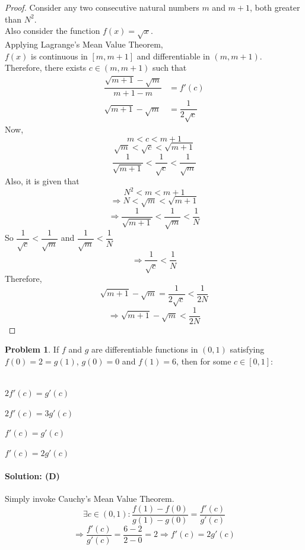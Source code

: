 \documentclass[14]{article}
\theoremstyle{definition}
\newtheorem{prob}{Problem}
\begin{document}
\begin{proof}
Consider any two consecutive natural numbers $m$ and $m + 1$, both greater than $N^2$.\\
Also consider the function $f(x) = \sqrt{x}$.\\
Applying Lagrange's Mean Value Theorem,\\
$f(x)$ is continuous in $[m, m + 1]$ and differentiable in $(m, m + 1)$.\\
Therefore, there exists $c \in (m, m+1)$ such that
\begin{align*}
\dfrac{\sqrt{m + 1} - \sqrt{m}}{m + 1 - m} &= f'(c)\\
\sqrt{m + 1} - \sqrt{m} &= \dfrac{1}{2\sqrt{c}}
\end{align*}
Now,
\[m < c < m + 1\]
\[\sqrt{m} < \sqrt{c} < \sqrt{m + 1}\]
\[\dfrac1{\sqrt{m + 1}} < \dfrac{1}{\sqrt{c}} < \dfrac1{\sqrt{m}}\]
Also, it is given that
\[N^2 < m < m + 1\]
\[\Rightarrow N < \sqrt{m} < \sqrt{m + 1}\]
\[\Rightarrow\dfrac1{\sqrt{m + 1}} < \dfrac1{\sqrt{m}} < \dfrac{1}{N}\]
So $\dfrac1{\sqrt{c}} < \dfrac1{\sqrt{m}}$ and $\dfrac{1}{\sqrt{m}} < \dfrac1{N}$
\[\Rightarrow \dfrac1{\sqrt{c}} < \dfrac1{N}\]
Therefore,
\[\sqrt{m + 1} - \sqrt{m} = \dfrac{1}{2\sqrt{c}} < \dfrac{1}{2N}\]
\[\Rightarrow\sqrt{m + 1} - \sqrt{m} < \dfrac{1}{2N}\]
\end{proof}
\begin{prob}
If $f$ and $g$ are differentiable functions in $(0, 1)$ satisfying $f(0) = 2 = g(1)$, $g(0) = 0$ and $f(1) = 6$, then for some $c \in [0, 1]$:\\\\
\begin{enumerate*}[label=(\Alph*)]
\item $2 f'(c) = g'(c)$\\
\item $2 f'(c) = 3g'(c)$\\
\item $f'(c) = g'(c)$\\
\item $f'(c) = 2 g'(c)$
\end{enumerate*}
\end{prob}
\paragraph{Solution: (D)}
Simply invoke Cauchy's Mean Value Theorem.\\
\[\exists c \in (0, 1) : \dfrac{f(1) - f(0)}{g(1) - g(0)} = \dfrac{f'(c)}{g'(c)}\]
\[\Rightarrow \dfrac{f'(c)}{g'(c)} = \dfrac{6 - 2}{2-0} = 2 \Rightarrow f'(c) = 2 g'(c)\]
\pagebreak
\end{document}

